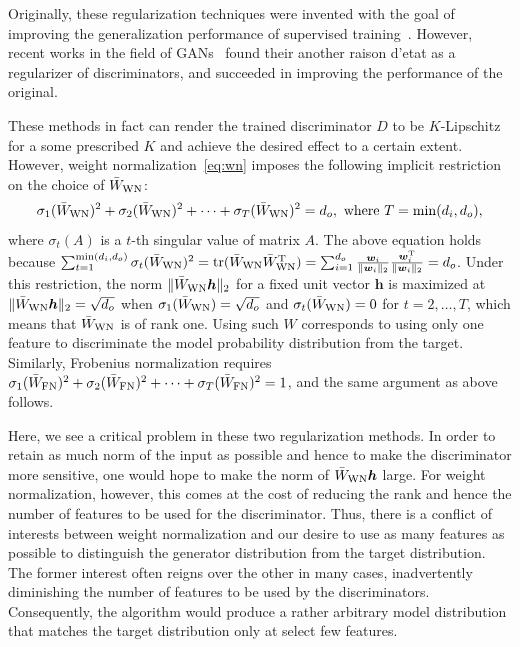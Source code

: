 \documentclass{article}
\newcommand{\bmw}{{\bm w}}
\newcommand{\bmh}{{\bm h}}
\begin{document}
Originally, these regularization techniques were invented with the goal of improving the generalization performance of supervised training~\cite[]{salimans2016weight, arpit2016normalization}.
However, recent works in the field of GANs~\cite[]{salimans2016improved, xiang2017effect} found their another raison d'etat as a regularizer of discriminators, and succeeded in improving the performance of the original.

These methods in fact can render the trained discriminator $D$ to be $K$-Lipschitz for a some prescribed $K$ and achieve the desired effect to a certain extent.
However, weight normalization~\eqref{eq:wn} imposes the following implicit restriction on the choice of $\bar{W}_{\rm WN}$:
\begin{align}
	\sigma_1(\bar{W}_{\rm WN})^2 + \sigma_2(\bar{W}_{\rm WN})^2 + \cdots + \sigma_T(\bar{W}_{\rm WN})^2 = d_o,~{\rm where}~T=\min(d_i,d_o), \label{eq:svconstraint_apd}
\end{align}
where $\sigma_t(A)$ is a $t$-th singular value of matrix $A$.
The above equation holds because $\sum_{t=1}^{\min(d_i,d_o)} \sigma_t(\bar{W}_{\rm WN})^2 = \mathrm{tr}(\bar{W}_{\rm WN} \bar{W}_{\rm WN}^{\rm T})=\sum_{i=1}^{d_o} \frac{\bmw_i}{\|\bmw_i\|_2}\frac{\bmw_i^{\rm T}}{\|\bmw_i\|_2} = d_o$.
Under this restriction, the norm $\|\bar{W}_{\rm WN}\bmh\|_2$ for a fixed unit vector $\bmh$ is maximized at $\| \bar{W}_{\rm WN} \bmh \|_2 =\sqrt{d_o}$ when $\sigma_1(\bar{W}_{\rm WN})=\sqrt{d_o}$ and $\sigma_t(\bar{W}_{\rm WN}) = 0$ for $t=2,\dots,T$, which means that  $\bar{W}_{\rm WN}$ is of rank one.
Using such $W$ corresponds to using only one feature to discriminate the model probability distribution from the target.
Similarly, Frobenius normalization requires $\sigma_1(\bar{W}_{\rm FN})^2 + \sigma_2(\bar{W}_{\rm FN})^2 +\cdots +\sigma_T(\bar{W}_{\rm FN})^2 = 1$, and the same argument as above follows.

Here, we see a critical problem in these two regularization methods.
In order to retain as much norm of the input as possible and hence to make the discriminator more sensitive, one would hope to make the norm of $\bar{W}_{\rm WN} \bmh$ large.
For weight normalization,  however, this comes at the cost of reducing the rank and hence the number of features to be used for the discriminator.
Thus, there is a conflict of interests between weight normalization and our desire to use as many features as possible to distinguish the generator distribution from the target distribution.
The former interest often reigns over the other in many cases, inadvertently diminishing the number of features to be used by the discriminators.
Consequently, the algorithm would produce a rather arbitrary model distribution that matches the target distribution only at select few features.
\end{document}
